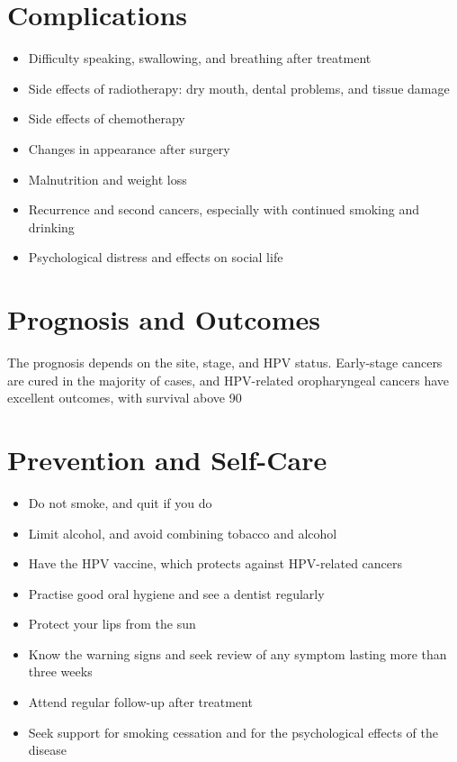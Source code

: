 \section*{Complications}
\begin{itemize}
    \item Difficulty speaking, swallowing, and breathing after treatment
    \item Side effects of radiotherapy: dry mouth, dental problems, and tissue damage
    \item Side effects of chemotherapy
    \item Changes in appearance after surgery
    \item Malnutrition and weight loss
    \item Recurrence and second cancers, especially with continued smoking and drinking
    \item Psychological distress and effects on social life
\end{itemize}

\section*{Prognosis and Outcomes}
The prognosis depends on the site, stage, and HPV status. Early-stage cancers are cured in the majority of cases, and HPV-related oropharyngeal cancers have excellent outcomes, with survival above 90%

\section*{Prevention and Self-Care}
\begin{itemize}
    \item Do not smoke, and quit if you do
    \item Limit alcohol, and avoid combining tobacco and alcohol
    \item Have the HPV vaccine, which protects against HPV-related cancers
    \item Practise good oral hygiene and see a dentist regularly
    \item Protect your lips from the sun
    \item Know the warning signs and seek review of any symptom lasting more than three weeks
    \item Attend regular follow-up after treatment
    \item Seek support for smoking cessation and for the psychological effects of the disease
\end{itemize}

